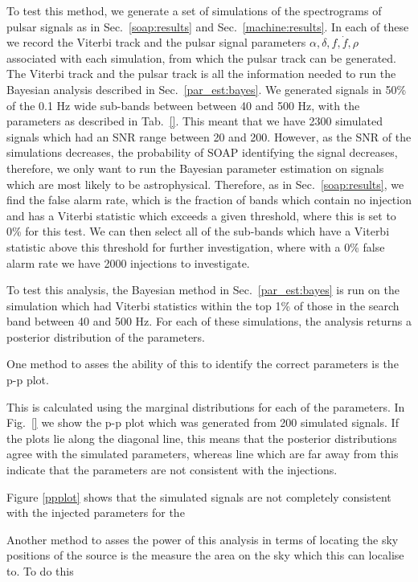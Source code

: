 To test this method, we generate a set of simulations of the spectrograms of pulsar signals as in Sec.~\ref{soap:results} and Sec.~\ref{machine:results}.
In each of these we record the Viterbi track and the pulsar signal parameters $\alpha, \delta, f, \dot{f} , \rho$ associated with each simulation, from which the pulsar track can be generated.
The Viterbi track and the pulsar track is all the information needed to run the Bayesian analysis described in Sec.~\ref{par_est:bayes}.
We generated signals in 50\% of the 0.1 Hz wide sub-bands between between 40 and 500 Hz, with the parameters as described in Tab.~\ref{}. 
This meant that we have 2300 simulated signals which had an \gls{SNR} range between 20 and 200.
However, as the \gls{SNR} of the simulations decreases, the probability of SOAP identifying the signal decreases, therefore, we only want to run the Bayesian parameter estimation on signals which are most likely to be astrophysical.
Therefore, as in Sec.~\ref{soap:results}, we find the false alarm rate, which is the fraction of bands which contain no injection and has a Viterbi statistic which exceeds a given threshold, where this is set to 0\% for this test.
We can then select all of the sub-bands which have a Viterbi statistic above this threshold for further investigation, where with a 0\% false alarm rate we have 2000 injections to investigate.

To test this analysis, the Bayesian method in Sec.~\ref{par_est:bayes} is run on the simulation which had Viterbi statistics within the top 1\% of those in the search band between 40 and 500 Hz.
For each of these simulations, the analysis returns a posterior distribution of the parameters.

One method to asses the ability of this to identify the correct parameters is the p-p plot.

This is calculated using the marginal distributions for each of the parameters.
In Fig.~\ref{} we show the p-p plot which was generated from  200 simulated signals.
If the plots lie along the diagonal line, this means that the posterior distributions agree with the simulated parameters, whereas line which are far away from this indicate that the parameters are not consistent with the injections.

Figure \ref{ppplot} shows that the simulated signals are not completely consistent with the injected parameters for the 


Another method to asses the power of this analysis in terms of locating the sky positions of the source is the measure the area on the sky which this can localise to.
To do this 




